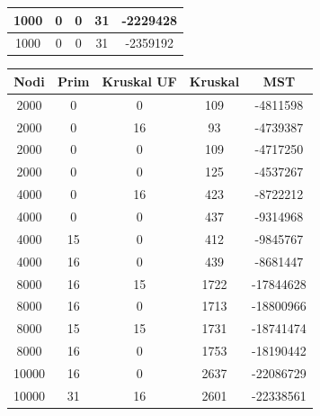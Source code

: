 \documentclass[a4paper]{article}
\begin{document}
\begin{table}[H]
\begin{minipage}[t]{10cm}
\begin{tabular}{|c|c|c|c|c|}
1000          & 0              & 0                   & 31               & -2229428     \\ \hline
1000          & 0              & 0                   & 31               & -2359192     \\ \hline
\end{tabular}
\end{minipage}
\begin{minipage}[t]{10cm}
\vspace{0pt}
\begin{tabular}{|c|c|c|c|c|}
\hline
\rowcolor{gray!50}
\textbf{Nodi} & \textbf{Prim} & \textbf{Kruskal UF} & \textbf{Kruskal} & \textbf{MST} \\ \hline
2000          & 0              & 0                   & 109              & -4811598     \\ \hline
2000          & 0              & 16                  & 93               & -4739387     \\ \hline
2000          & 0              & 0                   & 109              & -4717250     \\ \hline
2000          & 0              & 0                   & 125              & -4537267     \\ \hline
4000          & 0              & 16                  & 423              & -8722212     \\ \hline
4000          & 0              & 0                   & 437              & -9314968     \\ \hline
4000          & 15             & 0                   & 412              & -9845767     \\ \hline
4000          & 16             & 0                   & 439              & -8681447     \\ \hline
8000          & 16             & 15                  & 1722             & -17844628    \\ \hline
8000          & 16             & 0                   & 1713             & -18800966    \\ \hline
8000          & 15             & 15                  & 1731             & -18741474    \\ \hline
8000          & 16             & 0                   & 1753             & -18190442    \\ \hline
10000         & 16             & 0                   & 2637             & -22086729    \\ \hline
10000         & 31             & 16                  & 2601             & -22338561    \\ \hline

\end{tabular}
\end{minipage}
\end{table}
\end{document}

